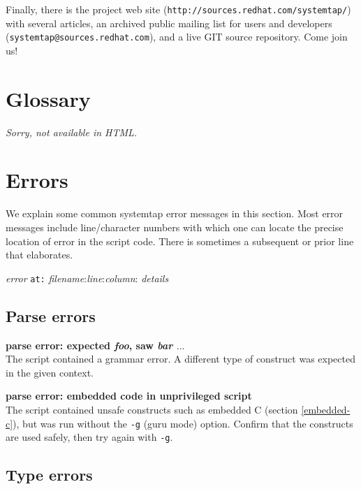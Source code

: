 \documentclass{article}
\begin{document}
Finally, there is the project web site
(\verb+http://sources.redhat.com/systemtap/+) with several articles,
an archived public mailing list for users and developers
(\verb+systemtap@sources.redhat.com+), and a live GIT source
repository.  Come join us!


\appendix

\section{Glossary}
\renewcommand{\nomname}{}
\printglossary
\begin{htmlonly}
{\em Sorry, not available in HTML.}
\end{htmlonly}

\section{Errors}

We explain some common systemtap error messages in this section.  Most
error messages include line/character numbers with which one can
locate the precise location of error in the script code.  There is
sometimes a subsequent or prior line that elaborates.

{\large {\em error} {\tt at:} {\em filename}:{\em line}:{\em column}: {\em details}}

\subsection{Parse errors}

\begin{description}
\item{\bf parse error: expected {\em foo}, saw {\em bar} $\ldots$} \\
The script contained a grammar error.  A different type of construct
was expected in the given context.

\item{\bf parse error: embedded code in unprivileged script} \\ The
script contained unsafe constructs such as embedded C (section
\ref{embedded-c}), but was run without the \verb+-g+ (guru mode)
option.  Confirm that the constructs are used safely, then try
again with \verb+-g+.
\end{description}

\subsection{Type errors}
\end{document}
